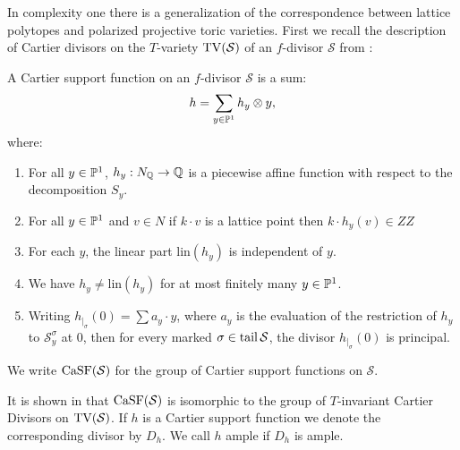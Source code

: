 In complexity one there is a generalization of the correspondence between lattice polytopes and polarized projective toric varieties. First we recall the description of Cartier divisors on the \(T\)-variety \(\operatorname{TV}(\mathcal{S})\) of an \(f\)-divisor \(\mathcal{S}\) from \cite{petersen2011torus}:
\begin{definition}
A Cartier support function on an \(f\)-divisor \(\mathcal{S}\) is a sum:
\[
h = \sum_{y \in \mathbb{P}^1} h_y \otimes y,
\]
where:
\begin{enumerate}
\item For all \(y \in \mathbb{P}^1\), \(h_y: N_{\mathbb{Q}} \to \mathbb{Q}\) is a piecewise affine function with respect to the decomposition \(S_y\).
\item For all \(y \in \mathbb{P}^1\) and \(v \in N\) if \(k \cdot v\) is a lattice point then \(k \cdot h_y(v) \in ZZ\)
\item For each \(y\), the linear part \(\text{lin}(h_y)\) is independent of \(y\).
\item We have \(h_y \neq \text{lin}(h_y)\) for at most finitely many \(y \in \mathbb{P}^1\).
\item Writing \(h_{|_\sigma}(0) = \sum a_y \cdot y\), where \(a_y\) is the evaluation of the restriction of \(h_y\) to \(\mathcal{S}_y^\sigma\) at \(0\), then for every marked \(\sigma \in \operatorname{tail} \mathcal{S}\), the divisor \(h_{|_\sigma}(0)\) is principal.
\end{enumerate}
We write \(\operatorname{CaSF}(\mathcal{S})\) for the group of Cartier support functions on \(\mathcal{S}\).
\end{definition}
It is shown in \cite{petersen2011torus} that \(\operatorname{CaSF}(\mathcal{S})\) is isomorphic to the group of \(T\)-invariant Cartier Divisors on \(\operatorname{TV}(\mathcal{S})\). If \(h\) is a Cartier support function we denote the corresponding divisor by \(D_h\). We call \(h\) ample if \(D_h\) is ample.

